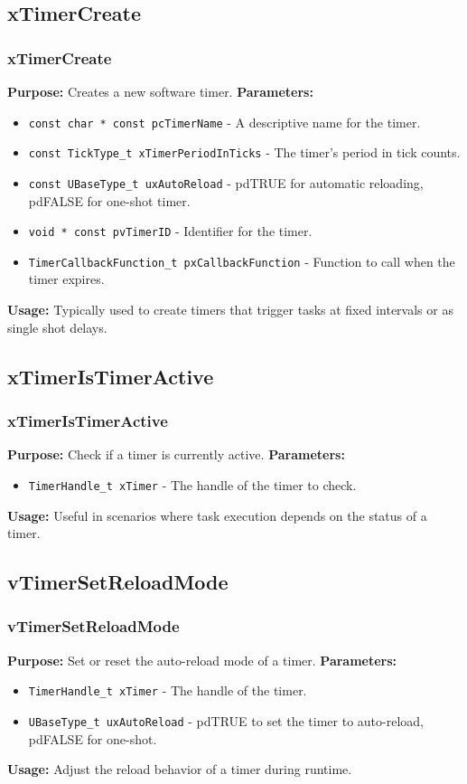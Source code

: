 \documentclass[10pt]{beamer}
\begin{document}
\subsection{xTimerCreate}
\begin{frame}[fragile]
    \frametitle{xTimerCreate}
    \textbf{Purpose:} Creates a new software timer.
    \textbf{Parameters:}
    \begin{itemize}
      \item \texttt{const char * const pcTimerName} - A descriptive name for the timer.
      \item \texttt{const TickType\_t xTimerPeriodInTicks} - The timer's period in tick counts.
      \item \texttt{const UBaseType\_t uxAutoReload} - pdTRUE for automatic reloading, pdFALSE for one-shot timer.
      \item \texttt{void * const pvTimerID} - Identifier for the timer.
      \item \texttt{TimerCallbackFunction\_t pxCallbackFunction} - Function to call when the timer expires.
    \end{itemize}
    \textbf{Usage:} Typically used to create timers that trigger tasks at fixed intervals or as single shot delays.
\end{frame}

\subsection{xTimerIsTimerActive}
\begin{frame}[fragile]
    \frametitle{xTimerIsTimerActive}
    \textbf{Purpose:} Check if a timer is currently active.
    \textbf{Parameters:}
    \begin{itemize}
      \item \texttt{TimerHandle\_t xTimer} - The handle of the timer to check.
    \end{itemize}
    \textbf{Usage:} Useful in scenarios where task execution depends on the status of a timer.
\end{frame}

\subsection{vTimerSetReloadMode}
\begin{frame}[fragile]
    \frametitle{vTimerSetReloadMode}
    \textbf{Purpose:} Set or reset the auto-reload mode of a timer.
    \textbf{Parameters:}
    \begin{itemize}
      \item \texttt{TimerHandle\_t xTimer} - The handle of the timer.
      \item \texttt{UBaseType\_t uxAutoReload} - pdTRUE to set the timer to auto-reload, pdFALSE for one-shot.
    \end{itemize}
    \textbf{Usage:} Adjust the reload behavior of a timer during runtime.
  \end{frame}
\end{document}
